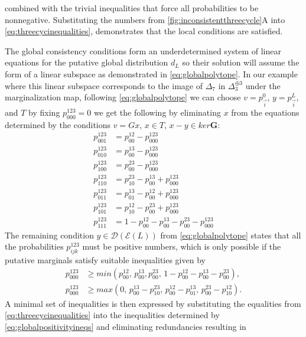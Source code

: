 combined with the trivial inequalities that force all probabilities to be nonnegative. Substituting the numbers from \ref{fig:inconsistentthreecycle}A into \ref{eq:threecycinequalities}, demonstrates that the local conditions are satisfied.

The global consistency conditions form an underdetermined system of linear equations for the putative global distribution $d_{L}$ so their solution will assume the form of a linear subspace as demonstrated in \ref{eq:globalpolytope}.  In our example where this linear subspace corresponds to the image of $\Delta_7$ in $\Delta_3^{\oplus 3}$ under the marginalization map, following \ref{eq:globalpolytope} we can choose $v=p^0_{\vec{i}}$, $y=p^L_{\vec{i}}$, and $T$ by fixing $p^{123}_{000}=0$ we get the following by eliminating $x$ from the equations determined by the conditions $v=Gx$, $x \in T$, $x-y \in ker \mathbf{G}$:
\begin{equation}
\begin{aligned}\label{eq:globalpositivityeqs}
p^{123}_{001} &= p^{12}_{00} - p^{123}_{000} \\
p^{123}_{010} &= p^{13}_{00} - p^{123}_{000} \\
p^{123}_{100} &= p^{23}_{00} - p^{123}_{000} \\
p^{123}_{110} &= p^{23}_{10} - p^{13}_{00} + p^{123}_{000} \\
p^{123}_{011} &= p^{13}_{01} - p^{12}_{00} + p^{123}_{000} \\
p^{123}_{101} &= p^{12}_{10} - p^{23}_{00} + p^{123}_{000} \\
p^{123}_{111} &= 1 - p^{12}_{00} - p^{13}_{00} - p^{23}_{00} - p^{123}_{000}
\end{aligned}
\end{equation}
The remaining condition $y \in \mathcal{D}(\mathcal{E}(L))$ from \ref{eq:globalpolytope} states that all the probabilities $p^{123}_{ijk}$ must be positive numbers, which is only possible if the putative marginals satisfy suitable inequalities given by
\begin{equation}
\begin{aligned}\label{eq:globalpositivityineqs}
p^{123}_{000} &\geq min(p^{12}_{00},\, p^{13}_{00},p^{23}_{00},\, 1 - p^{12}_{00} - p^{13}_{00} - p^{23}_{00}),\\
 p^{123}_{000} &\geq max(0,\, p^{13}_{00}-p^{23}_{10},\, p^{12}_{00}-p^{13}_{01},\, p^{23}_{00}-p^{12}_{10}).
\end{aligned}
\end{equation}
A minimal set of inequalities is then expressed by substituting the equalities from \ref{eq:threecycinequalities} into the inequalities determined by \ref{eq:globalpositivityineqs} and eliminating redundancies resulting in
